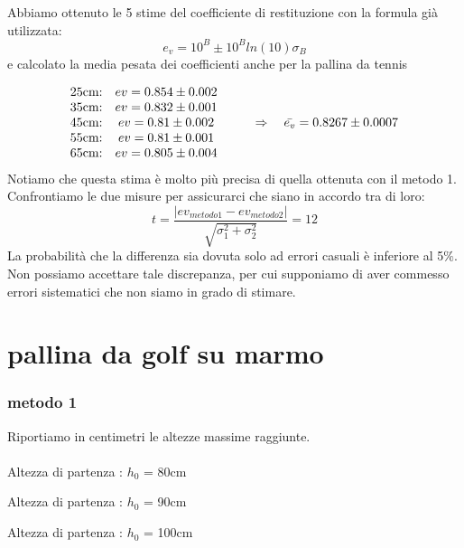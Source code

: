 \documentclass[a4paper]{article}
\theoremstyle{definition}
\begin{document}
	
	\noindent Abbiamo ottenuto le 5 stime del coefficiente di restituzione con la formula già utilizzata: \[e_{v}= 10^{B} \pm 10^{B}ln(10)\sigma_{B}\]
	e calcolato la media pesata dei coefficienti anche per la pallina da tennis
	
	\[\begin{matrix}
		$25cm:$ & $\(ev = 0.854 \pm 0.002\)$ &  \\ 
		$35cm:$ & $\(ev = 0.832 \pm 0.001\)$ &  \\ 
		$45cm:$ & $\(ev = 0.81 \pm 0.002\)$ & $\(\qquad \Rightarrow \quad \bar{e_{v}} = 0.8267 \pm 0.0007\)$\\ 
		$55cm:$ & $\(ev = 0.81 \pm 0.001\)$ &  \\ 
		$65cm:$ & $\(ev = 0.805 \pm 0.004\)$ & 
	\end{matrix}\]
\noindent Notiamo che questa stima è molto più precisa di quella ottenuta con il metodo 1. Confrontiamo le due misure per assicurarci che siano in accordo tra di loro:
		\[t = \frac{ \left |ev_{metodo1}  - ev_{metodo2} \right |}{\sqrt{\sigma_{1}^{2}+ \sigma_{2}^{2}}} = 12  \]
	\noindent La probabilità che la differenza sia dovuta solo ad errori casuali è inferiore al 5\(\%\). Non possiamo accettare tale discrepanza, per cui supponiamo di aver commesso errori sistematici che non siamo in grado di stimare.
	\section*{pallina da golf su marmo}
	\subsubsection*{metodo 1}
	Riportiamo in centimetri le altezze massime raggiunte.\\\\
\noindent Altezza di partenza : \(h_{0}\) = 80cm
	\begin{table}[!ht]
		\centering
		
	\end{table}

\noindent Altezza di partenza : \(h_{0}\) = 90cm
	\begin{table}[!ht]
		\centering
		
	\end{table}

\noindent Altezza di partenza : \(h_{0}\) = 100cm	
	\begin{table}[!ht]
		\centering
		
	\end{table}
\end{document}
